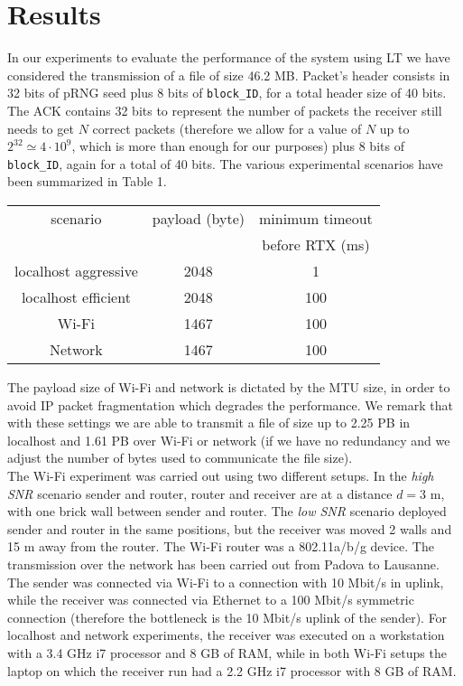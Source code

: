 \section{Results}\label{sec:results}
\setlength{\abovecaptionskip}{0pt plus 0pt minus 2pt}

In our experiments to evaluate the performance of the system using LT we have considered the transmission of a file of size 46.2 MB. Packet's header consists in 32 bits of pRNG seed plus 8 bits of \texttt{block\_ID}, for a total header size of 40 bits. The ACK contains 32 bits to represent the number of packets the receiver still needs to get $N$ correct packets (therefore we allow for a value of $N$ up to $2^{32}\simeq 4\cdot 10^9$, which is more than enough for our purposes) plus 8 bits of \texttt{block\_ID}, again for a total of 40 bits. The various experimental scenarios have been summarized in Table 1.

\begin{center}
\begin{tabular}{ccc}

\toprule
scenario & payload (byte) & minimum timeout\\
 & & before RTX (ms) \\
\midrule
localhost aggressive&2048&1\\
localhost efficient&2048&100\\
Wi-Fi&1467&100\\
Network&1467&100\\
\bottomrule
\end{tabular}
\end{center}
The payload size of Wi-Fi and network is dictated by the MTU size, in order to avoid IP packet fragmentation which degrades the performance. 
We remark that with these settings we are able to transmit a file of size up to 2.25 PB in localhost and 1.61 PB over Wi-Fi or network (if we have no redundancy and we adjust the number of bytes used to communicate the file size).\\
The Wi-Fi experiment was carried out using two different setups. In the \textit{high SNR} scenario sender and router, router and receiver are at a distance $d= 3$ m, with one brick wall between sender and router. The \textit{low SNR} scenario deployed sender and router in the same positions, but the receiver was moved 2 walls and 15 m away from the router. The Wi-Fi router was a 802.11a/b/g device. 
The transmission over the network has been carried out from Padova to Lausanne. The sender was connected via Wi-Fi to a connection with 10 Mbit/s in uplink, while the receiver was connected via Ethernet to a 100 Mbit/s symmetric connection (therefore the bottleneck is the 10 Mbit/s uplink of the sender). For localhost and network experiments, the receiver was executed on a workstation with a 3.4 GHz i7 processor and 8 GB of RAM, while in both Wi-Fi setups the laptop on which the receiver run had a 2.2 GHz i7 processor with 8 GB of RAM.

